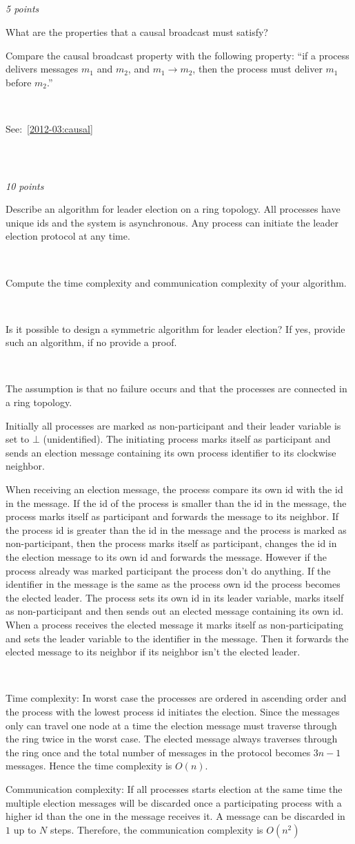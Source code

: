 \documentclass[a4paper]{article}
\newcommand{\points}[1]{\subsection{} \textit{#1 points}\\}
\newcommand{\question}[2][]{
  \parbox[t]{\textwidth}{
    \ifthenelse{\equal{#1}{}}{}{#1)}
    \parbox[t]{0.95\textwidth}{#2}}\\}
\newcommand{\solution}[2][]{
  \ifthenelse{\equal{#1}{} \or \equal{#1}{a}}{\\[3pt]\textit{Solution: }\\[0.1cm]}{}
  \question[#1]{#2}
}
\begin{document}
\points{5}
\question{
  What are the properties that a causal broadcast must satisfy?

  Compare the causal broadcast property with the following property:
  ``if a process delivers messages $m_1$ and $m_2$, and $m_1 \rightarrow
  m_2$, then the process must deliver $m_1$ before $m_2$.''
}
\solution{See:~\ref{2012-03:causal}}
%
\points{10}
\question[a]{
  Describe an algorithm for leader election on a ring topology. All
  processes have unique ids and the system is asynchronous. Any process
  can initiate the leader election protocol at any time.
}
\question[b]{
Compute the time complexity and communication complexity of
  your algorithm.
}
\question[c]{
  Is it possible to design a symmetric algorithm for leader
  election? If yes, provide such an algorithm, if no provide a proof.
}
%
\solution[a]{
  The assumption is that no failure occurs and that the processes are
  connected in a ring topology.

  Initially all processes are marked as non-participant and their leader
  variable is set to $\bot$ (unidentified). The initiating process marks
  itself as participant and sends an election message containing its own
  process identifier to its clockwise neighbor.

  When receiving an election message, the process compare its own id
  with the id in the message. If the id of the process is smaller than
  the id in the message, the process marks itself as participant and
  forwards the message to its neighbor. If the process id is greater
  than the id in the message and the process is marked as
  non-participant, then the process marks itself as participant, changes
  the id in the election message to its own id and forwards the
  message. However if the process already was marked participant the
  process don't do anything. If the identifier in the message is the
  same as the process own id the process becomes the elected leader. The
  process sets its own id in its leader variable, marks itself as
  non-participant and then sends out an elected message containing its
  own id. When a process receives the elected message it marks itself as
  non-participating and sets the leader variable to the identifier in the
  message. Then it forwards the elected message to its neighbor if its
  neighbor isn't the elected leader.
}
\solution[b]{
  Time complexity:
  In worst case the processes are ordered in ascending order and the
  process with the lowest process id initiates the election. Since the
  messages only can travel one node at a time the election message must
  traverse through the ring twice in the worst case. The elected message
  always traverses through the ring once and the total number of
  messages in the protocol becomes $3n-1$ messages.  Hence the time
  complexity is $O(n)$.

  Communication complexity:
  If all processes starts election at the same time the multiple
  election messages will be discarded once a participating process with
  a higher id than the one in the message receives it. A message can be
  discarded in $1$ up to $N$ steps.  Therefore, the communication
  complexity is $O(n^2)$
}
\end{document}
